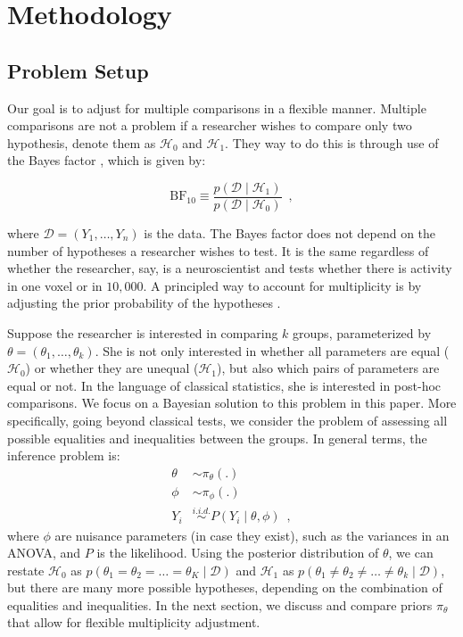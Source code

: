 \documentclass[11pt,a4paper]{article}
\theoremstyle{definition} %
\theoremstyle{case}
\begin{document}
\section{Methodology} \label{sec:methodology}
\subsection{Problem Setup}
Our goal is to adjust for multiple comparisons in a flexible manner. Multiple comparisons are not a problem if a researcher wishes to compare only two hypothesis, denote them as $\mathcal{H}_0$ and $\mathcal{H}_1$. They way to do this is through use of the Bayes factor \parencite[e.g.,][]{kass1995bayes, ly2016harold}, which is given by:

\begin{equation}
    \text{BF}_{10} \equiv \frac{p(\mathcal{D} \mid \mathcal{H}_1)}{p(\mathcal{D} \mid \mathcal{H}_0)} \enspace ,
\end{equation}

where $\mathcal{D} = (Y_1, \ldots, Y_n)$ is the data. The Bayes factor does not depend on the number of hypotheses a researcher wishes to test. It is the same regardless of whether the researcher, say, is a neuroscientist and tests whether there is activity in one voxel or in $10,000$. A principled way to account for multiplicity is by adjusting the prior probability of the hypotheses \parencite[e.g.,][]{jeffreys1961theory, westfall1997bayesian}.

Suppose the researcher is interested in comparing $k$ groups, parameterized by $\theta = (\theta_1, \ldots, \theta_k)$. She is not only interested in whether all parameters are equal ($\mathcal{H}_0$) or whether they are unequal ($\mathcal{H}_1$), but also which pairs of parameters are equal or not. In the language of classical statistics, she is interested in post-hoc comparisons. We focus on a Bayesian solution to this problem in this paper. More specifically, going beyond classical tests, we consider the problem of assessing all possible equalities and inequalities between the groups. In general terms, the inference problem is:
\begin{align*}
    \theta &\sim \pi_{\theta}(.) \\
    \phi &\sim \pi_{\phi}(.) \\
    Y_i &\overset{i.i.d.}{\sim} P(Y_i \mid \theta, \phi)  \enspace ,
\end{align*}
where $\phi$ are nuisance parameters (in case they exist), such as the variances in an ANOVA, and $P$ is the likelihood. Using the posterior distribution of $\theta$, we can restate $\mathcal{H}_0$ as $p(\theta_1 = \theta_2 = \ldots = \theta_K \mid \mathcal{D})$ and $\mathcal{H}_1$ as $p(\theta_1 \neq \theta_2 \neq \ldots \neq \theta_k \mid \mathcal{D})$, but there are many more possible hypotheses, depending on the combination of equalities and inequalities. In the next section, we discuss and compare priors $\pi_{\theta}$ that allow for flexible multiplicity adjustment.
\end{document}
